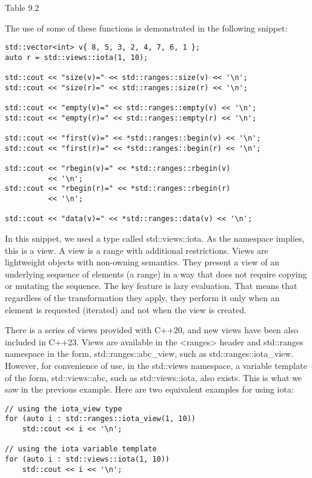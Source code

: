 \begin{center}
Table 9.2
\end{center}

The use of some of these functions is demonstrated in the following snippet:

\begin{lstlisting}[style=styleCXX]
std::vector<int> v{ 8, 5, 3, 2, 4, 7, 6, 1 };
auto r = std::views::iota(1, 10);

std::cout << "size(v)=" << std::ranges::size(v) << '\n';
std::cout << "size(r)=" << std::ranges::size(r) << '\n';

std::cout << "empty(v)=" << std::ranges::empty(v) << '\n';
std::cout << "empty(r)=" << std::ranges::empty(r) << '\n';

std::cout << "first(v)=" << *std::ranges::begin(v) << '\n';
std::cout << "first(r)=" << *std::ranges::begin(r) << '\n';

std::cout << "rbegin(v)=" << *std::ranges::rbegin(v)
		  << '\n';
std::cout << "rbegin(r)=" << *std::ranges::rbegin(r)
		  << '\n';
		  
std::cout << "data(v)=" << *std::ranges::data(v) << '\n';
\end{lstlisting}

In this snippet, we used a type called std::views::iota. As the namespace implies, this is a view. A view is a range with additional restrictions. Views are lightweight objects with non-owning semantics. They present a view of an underlying sequence of elements (a range) in a way that does not require copying or mutating the sequence. The key feature is lazy evaluation. That means that regardless of the transformation they apply, they perform it only when an element is requested (iterated) and not when the view is created.

There is a series of views provided with C++20, and new views have been also included in C++23. Views are available in the <ranges> header and std::ranges namespace in the form, std::ranges::abc\_view, such as std::ranges::iota\_view. However, for convenience of use, in the std::views namespace, a variable template of the form, std::views::abc, such as std::views::iota, also exists. This is what we saw in the previous example. Here are two equivalent examples for using iota:

\begin{lstlisting}[style=styleCXX]
// using the iota_view type
for (auto i : std::ranges::iota_view(1, 10))
	std::cout << i << '\n';

// using the iota variable template
for (auto i : std::views::iota(1, 10))
	std::cout << i << '\n';
\end{lstlisting}

